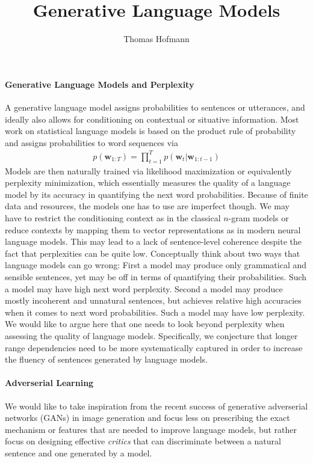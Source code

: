 \documentclass{article}
\title{Generative Language Models}
\author{Thomas Hofmann}
\newcommand{\w}{{\mathbf w}}
\begin{document}
\maketitle

\paragraph{Generative Language Models and Perplexity} 
A generative language model assigns probabilities to sentences or utterances, and ideally also allows for  conditioning on contextual or situative information. Most work on statistical language models is based on the product rule of probability and assigns probabilities to word sequences via 
\begin{align}
p(\w_{1:T}) = \prod_{t=1}^T p(\w_t | \w_{1:t-1})
\label{eq:product-rule}
\end{align} 
Models are then naturally trained via likelihood maximization or equivalently perplexity minimization, which essentially measures the quality of a language model by its accuracy in quantifying the next word probabilities. Because of finite data and resources, the models one has to use are imperfect though. We may have to restrict the conditioning context as in the classical $n$-gram models or reduce contexts by mapping them to vector representations as in modern neural language models. This may lead to a lack of sentence-level coherence despite the fact that perplexities can be quite low.  Conceptually think about two ways that language models can go wrong: First a model may produce only grammatical and sensible sentences, yet may be off in terms of quantifying their probabilities. Such a model may have high next word perplexity. Second a model may produce mostly incoherent and unnatural sentences, but achieves relative high accuracies when it comes to next word probabilities. Such a model may have low perplexity. We would like to argue here that one needs to look beyond perplexity when assessing the quality of language models. Specifically, we conjecture that longer range dependencies need to be more systematically captured in order to increase the fluency of sentences generated by language models.

\paragraph{Adverserial Learning} We would like to take inspiration from the recent success of generative adverserial networks (GANs) \cite{goodfellow2014generative} in image generation and focus less on prescribing the exact mechanism or features that are needed to improve language models, but rather focus on designing effective \textit{critics} that can discriminate between a natural sentence and one generated by a model. 



\end{document}
